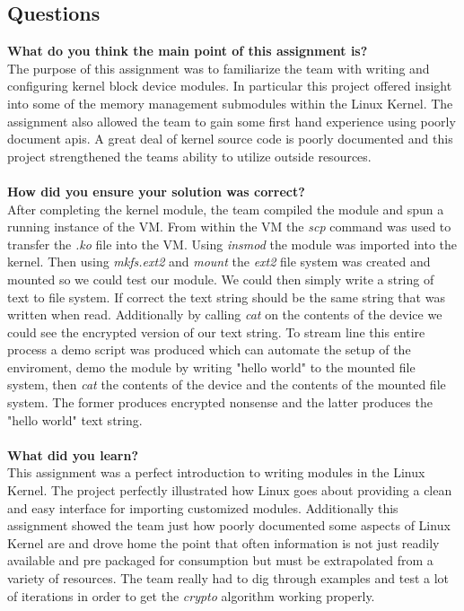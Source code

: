 \documentclass[10pt,onecolumn,draftclsnofoot]{IEEEtran} %
\begin{document}
\begin{singlespace}
\section{\bf Questions}
        \textbf{What do you think the main point of this assignment is?}\\
                \normalfont \indent The purpose of this assignment was to familiarize the team with writing and configuring kernel block device modules. In particular this project offered insight into some of the memory management submodules within the Linux Kernel. The assignment also allowed the team to gain some first hand experience using poorly document apis. A great deal of kernel source code is poorly documented and this project strengthened the teams ability to utilize outside resources. \\\\
        \textbf{How did you ensure your solution was correct?}\\
                \normalfont \indent After completing the kernel module, the team compiled the module and spun a running instance of the VM. From within the VM the \textit{scp} command was used to transfer the \textit{.ko} file into the VM. Using \textit{insmod} the module was imported into the kernel. Then using \textit{mkfs.ext2} and \textit{mount} the \textit{ext2} file system was created and mounted so we could test our module. We could then simply write a string of text to file system. If correct the text string should be the same string that was written when read. Additionally by calling \textit{cat } on the contents of the device we could see the encrypted version of our text string. To stream line this entire process a demo script was produced which can automate the setup of the enviroment, demo the module by writing "hello world" to the mounted file system, then \textit{cat} the contents of the device and the contents of the mounted file system. The former produces encrypted nonsense and the latter produces the "hello world" text string. \\\\
        \textbf{What did you learn?}\\
        \normalfont \indent This assignment was a perfect introduction to writing modules in the Linux Kernel. The project perfectly illustrated how Linux goes about providing a clean and easy interface for importing customized modules. Additionally this assignment showed the team just how poorly documented some aspects of Linux Kernel are and drove home the point that often information is not just readily available and pre packaged for consumption but must be extrapolated from a variety of resources. The team really had to dig through examples and test a lot of iterations in order to get the \textit{crypto} algorithm working properly.\\\\

\end{singlespace}
\end{document}
